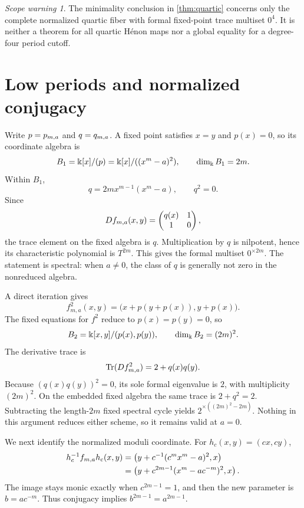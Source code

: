 \documentclass[11pt]{article}
\theoremstyle{definition}
\theoremstyle{remark}
\newtheorem{warning}[theorem]{Scope warning}
\begin{document}
\begin{warning}
The minimality conclusion in \cref{thm:quartic} concerns only the complete
normalized quartic fiber with formal fixed-point trace multiset \(0^4\).  It
is neither a theorem for all quartic H\'enon maps nor a global equality for a
degree-four period cutoff.
\end{warning}

\section{Low periods and normalized conjugacy}
\label{sec:low-periods}

Write \(p=p_{m,a}\) and \(q=q_{m,a}\).  A fixed point satisfies \(x=y\) and
\(p(x)=0\), so its coordinate algebra is
\begin{equation}
B_1=\Bbbk[x]/(p)=\Bbbk[x]/((x^m-a)^2),
\qquad \dim_{\Bbbk}B_1=2m.
\label{eq:fixed-algebra}
\end{equation}
Within \(B_1\),
\[
q=2m x^{m-1}(x^m-a),
\qquad q^2=0.
\]
Since
\[
Df_{m,a}(x,y)=
\begin{pmatrix}q(x)&1\\1&0\end{pmatrix},
\]
the trace element on the fixed algebra is \(q\).  Multiplication by \(q\)
is nilpotent, hence its characteristic polynomial is \(T^{2m}\).  This gives
the formal multiset \(0^{\times2m}\).  The statement is spectral: when
\(a\ne0\), the class of \(q\) is generally not zero in the nonreduced
algebra.

A direct iteration gives
\[
f_{m,a}^2(x,y)=\bigl(x+p(y+p(x)),y+p(x)\bigr).
\]
The fixed equations for \(f^2\) reduce to \(p(x)=p(y)=0\), so
\begin{equation}
B_2=\Bbbk[x,y]/(p(x),p(y)),
\qquad \dim_{\Bbbk}B_2=(2m)^2.
\label{eq:period-two-algebra}
\end{equation}
The derivative trace is
\[
\operatorname{Tr}(Df_{m,a}^2)=2+q(x)q(y).
\]
Because \((q(x)q(y))^2=0\), its sole formal eigenvalue is \(2\), with
multiplicity \((2m)^2\).  On the embedded fixed algebra the same trace is
\(2+q^2=2\).  Subtracting the length-\(2m\) fixed spectral cycle yields
\(2^{\times((2m)^2-2m)}\).  Nothing in this argument reduces either
scheme, so it remains valid at \(a=0\).

We next identify the normalized moduli coordinate.  For
\(h_c(x,y)=(cx,cy)\),
\begin{align}
h_c^{-1}f_{m,a}h_c(x,y)
&=\left(y+c^{-1}(c^m x^m-a)^2,x\right)\notag\\
&=\left(y+c^{2m-1}(x^m-ac^{-m})^2,x\right).
\label{eq:diagonal-conjugacy}
\end{align}
The image stays monic exactly when \(c^{2m-1}=1\), and then the new
parameter is \(b=ac^{-m}\).  Thus conjugacy implies
\(b^{2m-1}=a^{2m-1}\).
\end{document}
